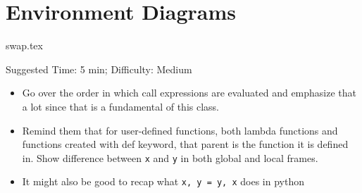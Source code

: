 \documentclass{exam}
\begin{document}
\section{Environment Diagrams}
\begin{questions}
    {swap.tex}
    \begin{questionmeta}
        Suggested Time: 5 min; Difficulty: Medium
        \begin{itemize}
            \item Go over the order in which call expressions are evaluated and emphasize that a lot since that is a fundamental of this class.
            \item Remind them that for user-defined functions, both lambda functions and functions created with def keyword, that parent is the function it is defined in.
            \subitem Show difference between \lstinline{x} and \lstinline{y} in both global and local frames.
            \item It might also be good to recap what \lstinline{x, y = y, x} does in python
        \end{itemize}
      \end{questionmeta}          
\end{questions}
\end{document}
